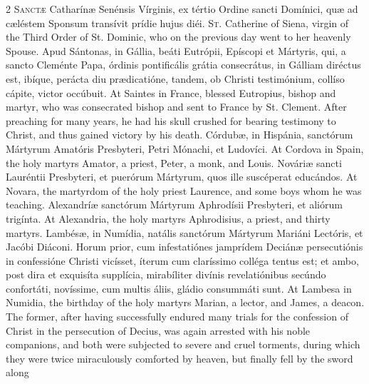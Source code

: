 \begin{paracol}{2}
\lettrine[lines=2]{S}{anctæ} Catharínæ 
 Senénsis Vírginis, ex tértio Ordine sancti Domínici, quæ ad cæléstem Sponsum 
 transívit prídie hujus diéi.
\switchcolumn
{}
\lettrine[lines=2]{S}{t.} Catherine of Siena, virgin of 
 the Third Order of St. Dominic, who on the previous day went to her heavenly 
 Spouse.
\switchcolumn*
{}
Apud Sántonas, in 
 Gállia, beáti Eutrópii, Epíscopi et Mártyris, qui, a sancto Cleménte Papa, 
 órdinis pontificális grátia consecrátus, in Gálliam diréctus est, ibíque, 
 perácta diu prædicatióne, tandem, ob Christi testimónium, collíso cápite, 
 victor occúbuit.
\switchcolumn
{}
At Saintes in France, blessed 
 Eutropius, bishop and martyr, who was consecrated bishop and sent to France 
 by St. Clement. After preaching for many years, he had his skull 
 crushed for bearing testimony to Christ, and thus gained victory by his 
 death.
\switchcolumn*
{}
Córdubæ, in Hispánia, sanctórum Mártyrum Amatóris Presbyteri, Petri Mónachi, et Ludovíci.
\switchcolumn
{}
At Cordova in Spain, the holy 
 martyrs Amator, a priest, Peter, a monk, and Louis.
\switchcolumn*
{}
Nováriæ sancti 
 Lauréntii Presbyteri, et puerórum Mártyrum, quos ille suscéperat educándos.
\switchcolumn
{}
At Novara, the martyrdom of the 
 holy priest Laurence, and some boys whom he was teaching.
\switchcolumn*
{}
Alexandríæ sanctórum 
 Mártyrum Aphrodísii Presbyteri, et aliórum trigínta.
\switchcolumn
{}
At Alexandria, the holy martyrs 
 Aphrodisius, a priest, and thirty martyrs.
\switchcolumn*
{}
Lambésæ, in Numídia, 
 natális sanctórum Mártyrum Mariáni Lectóris, et Jacóbi Diáconi. Horum 
 prior, cum infestatiónes jamprídem Deciánæ persecutiónis in confessióne 
 Christi vicísset, íterum cum claríssimo colléga tentus est; et ambo, post 
 dira et exquisíta supplícia, mirabíliter divínis revelatiónibus secúndo 
 confortáti, novíssime, cum multis áliis, gládio consummáti sunt.
\switchcolumn
{}
At Lambesa in Numidia, the birthday 
 of the holy martyrs Marian, a lector, and James, a deacon. The former, 
 after having successfully endured many trials for the confession of Christ 
 in the persecution of Decius, was again arrested with his noble companions, 
 and both were subjected to severe and cruel torments, during which they were 
 twice miraculously comforted by heaven, but finally fell by the sword along 

\end{paracol}
